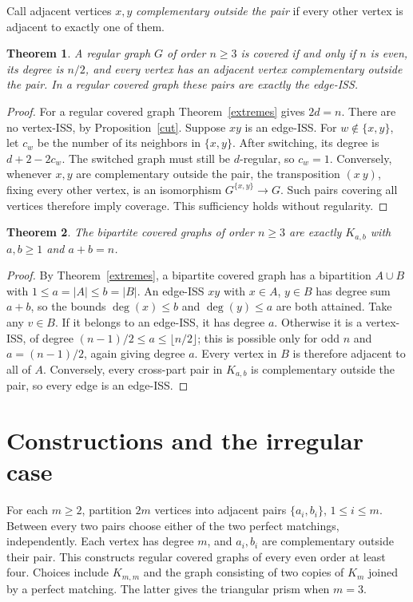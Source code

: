 \documentclass[11pt]{article}
\newtheorem{theorem}{Theorem}
\theoremstyle{definition}
\begin{document}
Call adjacent vertices $x,y$ \emph{complementary outside the pair} if
every other vertex is adjacent to exactly one of them.
\begin{theorem}\label{regular}
A regular graph $G$ of order $n\geq3$ is covered if and only if $n$ is
even, its degree is $n/2$, and every vertex has an adjacent vertex
complementary outside the pair. In a regular covered graph these pairs
are exactly the edge-ISS.
\end{theorem}
\begin{proof}
For a regular covered graph Theorem~\ref{extremes} gives $2d=n$.
There are no vertex-ISS, by Proposition~\ref{cut}. Suppose $xy$ is an
edge-ISS. For $w\notin\{x,y\}$, let $c_w$ be the number of its neighbors
in $\{x,y\}$. After switching, its degree is $d+2-2c_w$. The switched
graph must still be $d$-regular, so $c_w=1$.
Conversely, whenever $x,y$ are complementary outside the pair, the
transposition $(x\ y)$, fixing every other vertex, is an isomorphism
$G^{\{x,y\}}\to G$. Such pairs covering all vertices therefore imply
coverage. This sufficiency holds without regularity.
\end{proof}

\begin{theorem}\label{bipartite}
The bipartite covered graphs of order $n\geq3$ are exactly
$K_{a,b}$ with $a,b\geq1$ and $a+b=n$.
\end{theorem}
\begin{proof}
By Theorem~\ref{extremes}, a bipartite covered graph has a bipartition
$A\cup B$ with $1\leq a=|A|\leq b=|B|$. An edge-ISS $xy$ with
$x\in A$, $y\in B$ has degree sum $a+b$, so the bounds
$\deg(x)\leq b$ and $\deg(y)\leq a$ are both attained.
Take any $v\in B$. If it belongs to an edge-ISS, it has degree $a$.
Otherwise it is a vertex-ISS, of degree $(n-1)/2\leq a\leq\lfloor n/2\rfloor$;
this is possible only for odd $n$ and $a=(n-1)/2$, again giving degree
$a$. Every vertex in $B$ is therefore adjacent to all of $A$.
Conversely, every cross-part pair in $K_{a,b}$ is complementary outside
the pair, so every edge is an edge-ISS.
\end{proof}

\section{Constructions and the irregular case}
For each $m\geq2$, partition $2m$ vertices into adjacent pairs
$\{a_i,b_i\}$, $1\leq i\leq m$. Between every two pairs choose either
of the two perfect matchings, independently. Each vertex has degree $m$,
and $a_i,b_i$ are complementary outside their pair. This constructs
regular covered graphs of every even order at least four. Choices include
$K_{m,m}$ and the graph consisting of two copies of $K_m$ joined by a
perfect matching. The latter gives the triangular prism when $m=3$.
\end{document}
